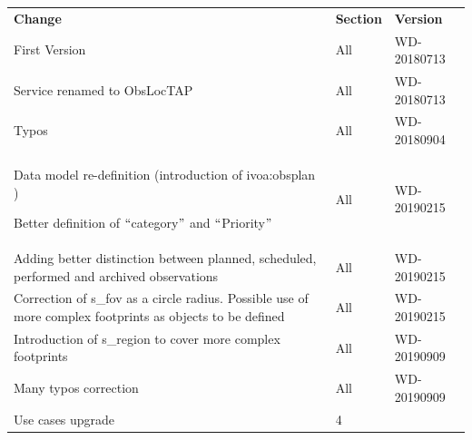 \documentclass[11pt,a4paper]{ivoa}
\begin{document}

\begin{table}[H]
 			\centering
\begin{tabular}{p{3.75in}p{0.92in}p{0.8in}}
\hline
\multicolumn{1}{|p{3.75in}}{\textbf{Change}} &
\multicolumn{1}{|p{0.72in}}{\textbf{Section}} &
\multicolumn{1}{|p{0.9in}|}{\textbf{Version}} \\
\multicolumn{1}{|p{3.75in}}{First Version} &
\multicolumn{1}{|p{0.72in}}{All} &
\multicolumn{1}{|p{0.9in}|}{{\fontsize{10pt}{12.0pt}\selectfont WD-20180713}} \\
\multicolumn{1}{|p{3.75in}}{Service renamed to ObsLocTAP} &
\multicolumn{1}{|p{0.72in}}{All} &
\multicolumn{1}{|p{0.9in}|}{{\fontsize{10pt}{12.0pt}\selectfont WD-20180713}} \\
\multicolumn{1}{|p{3.75in}}{Typos} &
\multicolumn{1}{|p{0.72in}}{All} &
\multicolumn{1}{|p{0.9in}|}{{\fontsize{10pt}{12.0pt}\selectfont WD-20180904}} \\
\multicolumn{1}{|p{3.75in}}{Data model re-definition (introduction of ivoa:obsplan ) \par Better definition of $``$category$"$  and $``$Priority$"$ } &
\multicolumn{1}{|p{0.72in}}{All} &
\multicolumn{1}{|p{0.9in}|}{{\fontsize{10pt}{12.0pt}\selectfont WD-20190215}} \\
\multicolumn{1}{|p{3.75in}}{Adding better distinction between planned, scheduled, performed and archived observations} &
\multicolumn{1}{|p{0.72in}}{All} &
\multicolumn{1}{|p{0.9in}|}{{\fontsize{10pt}{12.0pt}\selectfont WD-20190215}} \\
\multicolumn{1}{|p{3.75in}}{Correction of s\_fov as a circle radius. Possible use of more complex footprints as objects to be defined} &
\multicolumn{1}{|p{0.72in}}{All} &
\multicolumn{1}{|p{0.9in}|}{{\fontsize{10pt}{12.0pt}\selectfont WD-20190215}} \\
\multicolumn{1}{|p{3.75in}}{Introduction of s\_region to cover more complex footprints} &
\multicolumn{1}{|p{0.72in}}{All} &
\multicolumn{1}{|p{0.9in}|}{{\fontsize{10pt}{12.0pt}\selectfont WD-20190909}} \\
\multicolumn{1}{|p{3.75in}}{Many typos correction} &
\multicolumn{1}{|p{0.72in}}{All} &
\multicolumn{1}{|p{0.9in}|}{{\fontsize{10pt}{12.0pt}\selectfont WD-20190909}} \\
\multicolumn{1}{|p{3.75in}}{Use cases upgrade} &
\multicolumn{1}{|p{0.72in}}{4} &

\end{tabular}
\end{table}
\end{document}
